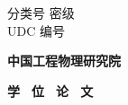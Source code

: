 \pagestyle{empty}
\noindent
分类号
\fixedunderline[4cm]{\theclsnum}
\hfill
密级
\fixedunderline[4cm]{\theconflv} \\
\noindent
UDC \hspace{0.5em}
\fixedunderline[4cm]{\theUDC}
\hfill
编号
\fixedunderline[4cm]{\thethesisnum}

\begin{center}
  \vspace{10pt}
  \bfseries 中国工程物理研究院
  \vspace{0.5em}
\end{center}
\begin{center}
  \bfseries
  学 \, 位 \, 论 \, 文
\end{center}

\begin{center}
  \vspace{10pt}
  \underline{\bfseries \thecntitle}
\end{center}

\begin{center}
  \vspace{20pt}
  \bfseries
  \underline{\thecnauthor}
\end{center}

\vspace{20pt}

